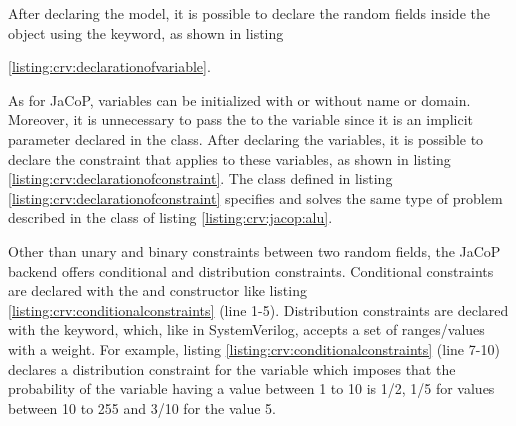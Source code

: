 After declaring the model, it is possible to declare the random fields inside
the object using the  keyword, as shown in listing

\ref{listing:crv:declarationofvariable}.

As for JaCoP, variables can be initialized with or without name or domain.
Moreover, it is unnecessary to pass the  to the variable since it
is an implicit parameter declared in the  class. After declaring
the variables, it is possible to declare the constraint that applies to these
variables, as shown in listing \ref{listing:crv:declarationofconstraint}. The
class defined in listing \ref{listing:crv:declarationofconstraint} specifies and
solves the same type of problem described in the class of listing
\ref{listing:crv:jacop:alu}.


Other than unary and binary constraints between two random fields, the JaCoP
backend offers conditional and distribution constraints. Conditional constraints
are declared with the  and  constructor like
listing \ref{listing:crv:conditionalconstraints} (line 1-5). Distribution
constraints are declared with the  keyword, which, like in
SystemVerilog, accepts a set of ranges/values with a weight. For example,
listing \ref{listing:crv:conditionalconstraints} (line 7-10) declares a
distribution constraint for the variable  which imposes that the
probability of the variable having a value between 1 to 10 is 1/2, 1/5 for
values between 10 to 255 and 3/10 for the value 5.

